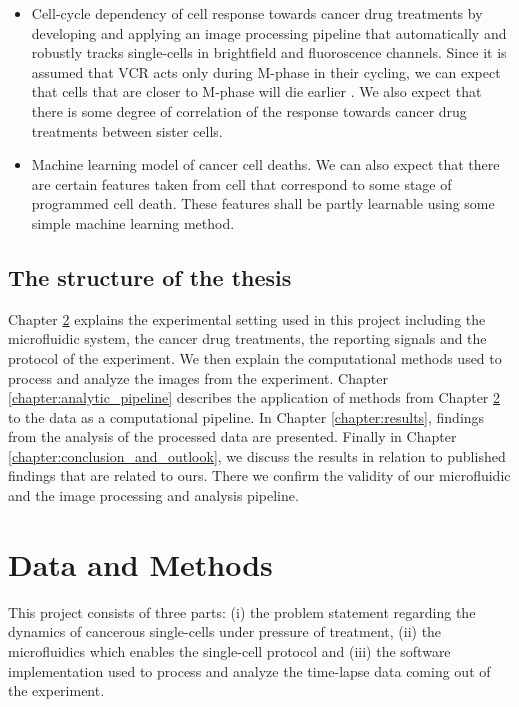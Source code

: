 \documentclass[pdftex,12pt,a4paper]{report}
\begin{document}
\begin{itemize}
\item Cell-cycle dependency of cell response towards cancer drug  treatments by developing and applying an image processing pipeline that automatically and robustly tracks single-cells in brightfield and fluoroscence channels. Since it is assumed that VCR acts only during M-phase in their cycling, we can expect that cells that are closer to M-phase will die earlier \cite{gascoigne2008cancer, holland2008beyond}. We also expect that there is some degree of correlation of the response towards cancer drug treatments between sister cells.
\item Machine learning model of cancer cell deaths. We can also expect that there are certain features taken from cell that correspond to some stage of programmed cell death.  These features shall be partly learnable using some simple machine learning method.
\end{itemize}


\section{The structure of the thesis}


Chapter \ref{chapter:data_and_method} explains the experimental setting used in this project including the microfluidic system, the cancer drug treatments, the reporting signals and the protocol of the experiment. We then explain the computational methods used to process and analyze the images from the experiment. Chapter \ref{chapter:analytic_pipeline} describes the application of methods from Chapter \ref{chapter:data_and_method} to the data as a computational pipeline. In Chapter \ref{chapter:results}, findings from the analysis of the processed data are presented. Finally in Chapter \ref{chapter:conclusion_and_outlook}, we discuss the results in relation to published findings that are related to ours. There we confirm the validity of our microfluidic and the image processing and analysis pipeline.

\chapter{Data and Methods}

\label{chapter:data_and_method}

This project consists of three parts: (i) the problem statement regarding the dynamics of cancerous single-cells under pressure of treatment, (ii) the microfluidics which enables the single-cell protocol and (iii) the software implementation used to process and analyze the time-lapse data coming out of the experiment.
\end{document}
